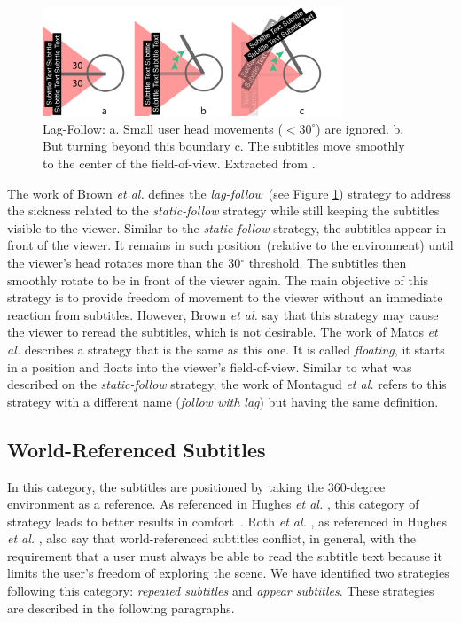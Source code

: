\begin{figure}[!ht]
    \centering
    \includegraphics[width=0.8\textwidth]{img/video360/lag-follow.png}
    \caption{Lag-Follow: a. Small user head movements ($<30^{\circ}$) are ignored. b. But turning beyond this boundary c. The subtitles move smoothly to the center of the field-of-view. Extracted from \cite{brown_subtitles_2017}.}
    \label{fig:lag_follow}
\end{figure}

The work of Brown \emph{et al.} \cite{brown_subtitles_2017} defines the \emph{lag-follow}~(see Figure \ref{fig:lag_follow}) strategy to address the sickness related to the \emph{static-follow} strategy while still keeping the subtitles visible to the viewer. Similar to the \emph{static-follow} strategy, the subtitles appear in front of the viewer. It remains in such position~(relative to the environment) until the viewer's head rotates more than the 30$^{\circ}$ threshold. The subtitles then smoothly rotate to be in front of the viewer again. The main objective of this strategy is to provide freedom of movement to the viewer without an immediate reaction from subtitles. However, Brown \emph{et al.} \cite{brown_subtitles_2017} say that this strategy may cause the viewer to reread the subtitles, which is not desirable.
The work of Matos \emph{et al.} \cite{matos_dynamic_2018} describes a strategy that is the same as this one. It is called \emph{floating}, it starts in a position and floats into the viewer's field-of-view. Similar to what was described on the \emph{static-follow} strategy, the work of Montagud \emph{et al.} \cite{montagud_culture_2020} refers to this strategy with a different name (\emph{follow with lag}) but having the same definition.

\subsection{World-Referenced Subtitles}
\label{subsec:world_referenced}

In this category, the subtitles are positioned by taking the 360-degree environment as a reference. 
As referenced in Hughes \emph{et al.} \cite{hughes_disruptive_2019}, this category of strategy leads to better results in comfort~\cite{rothe2018positioning}. Roth \emph{et al.} \cite{rothe2018positioning}, as referenced in Hughes \emph{et al.} \cite{hughes_disruptive_2019}, also say that world-referenced subtitles conflict, in general, with the requirement that a user must always be able to read the subtitle text because it limits the user's freedom of exploring the scene.
We have identified two strategies following this category: \emph{repeated subtitles} and \emph{appear subtitles}. These strategies are described in the following paragraphs. 

